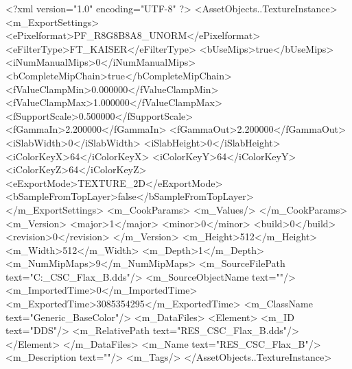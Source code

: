 <?xml version="1.0" encoding="UTF-8" ?>
<AssetObjects..TextureInstance>
	<m_ExportSettings>
		<ePixelformat>PF_R8G8B8A8_UNORM</ePixelformat>
		<eFilterType>FT_KAISER</eFilterType>
		<bUseMips>true</bUseMips>
		<iNumManualMips>0</iNumManualMips>
		<bCompleteMipChain>true</bCompleteMipChain>
		<fValueClampMin>0.000000</fValueClampMin>
		<fValueClampMax>1.000000</fValueClampMax>
		<fSupportScale>0.500000</fSupportScale>
		<fGammaIn>2.200000</fGammaIn>
		<fGammaOut>2.200000</fGammaOut>
		<iSlabWidth>0</iSlabWidth>
		<iSlabHeight>0</iSlabHeight>
		<iColorKeyX>64</iColorKeyX>
		<iColorKeyY>64</iColorKeyY>
		<iColorKeyZ>64</iColorKeyZ>
		<eExportMode>TEXTURE_2D</eExportMode>
		<bSampleFromTopLayer>false</bSampleFromTopLayer>
	</m_ExportSettings>
	<m_CookParams>
		<m_Values/>
	</m_CookParams>
	<m_Version>
		<major>1</major>
		<minor>0</minor>
		<build>0</build>
		<revision>0</revision>
	</m_Version>
	<m_Height>512</m_Height>
	<m_Width>512</m_Width>
	<m_Depth>1</m_Depth>
	<m_NumMipMaps>9</m_NumMipMaps>
	<m_SourceFilePath text="C:\Users\Shadow\Desktop\RES_CSC_Flax_B.dds"/>
	<m_SourceObjectName text=""/>
	<m_ImportedTime>0</m_ImportedTime>
	<m_ExportedTime>3085354295</m_ExportedTime>
	<m_ClassName text="Generic_BaseColor"/>
	<m_DataFiles>
		<Element>
			<m_ID text="DDS"/>
			<m_RelativePath text="RES_CSC_Flax_B.dds"/>
		</Element>
	</m_DataFiles>
	<m_Name text="RES_CSC_Flax_B"/>
	<m_Description text=""/>
	<m_Tags/>
</AssetObjects..TextureInstance>

